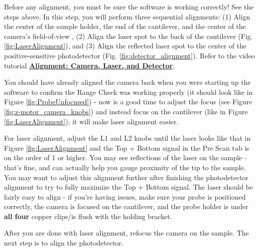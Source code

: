 \documentclass{../lab}
\begin{document}
Before any alignment, you must be sure the software is working correctly! See the steps above. In this step, you will perform three sequential alignments: (1) Align the center of the sample holder, the end of the cantilever, and the center of the camera's field-of-view%
, (2) Align the laser spot to the back of the cantilever (Fig. \ref{fig:LaserAlignment}), and (3) Align the reflected laser spot to the center of the positive-sensitive photodetector (Fig. \ref{fig:detector_alignment}). Refer to the video tutorial  \href{https://berkeley-physics111b.github.io/assets/pdf/oldwebsitestructure/alignment\_final2.mp4}{\textbf{Alignment: Camera, Laser, and Detector}}. 

You should have already aligned the camera back when you were starting up the software to confirm the Range Check was working properly (it should look like in Figure \ref{fig:ProbeUnfocused}) - now is a good time to adjust the focus (see Figure \ref{fig:z-motor_camera_knobs}) and instead focus on the cantilever (like in Figure \ref{fig:LaserAlignment}); it will make laser alignment easier. 

For laser alignment, adjust the L1 and L2 knobs until the laser looks like that in Figure \ref{fig:LaserAlignment} and the Top + Bottom signal in the Pre Scan tab is on the order of 1 or higher. You may see reflections of the laser on the sample - that's fine, and can actually help you gauge proximity of the tip to the sample. You may want to adjust this alignment further after finishing the photodetector alignment to try to fully maximize the Top + Bottom signal. The laser should be fairly easy to align - if you're having issues, make sure your probe is positioned correctly, the camera is focused on the cantilever, and the probe holder is under \textbf{all four} copper clips/is flush with the holding bracket.

After you are done with laser alignment, refocus the camera on the sample. The next step is to align the photodetector.
\end{document}

